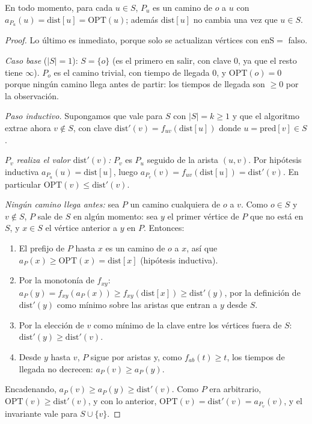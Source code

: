 \begin{lema}
En todo momento, para cada $u\in S$, $P_u$ es un camino de $o$ a $u$ con $a_{P_u}(u)=\mathrm{dist}[u]=\mathrm{OPT}(u)$; además $\mathrm{dist}[u]$ no cambia una vez que $u\in S$.
\end{lema}
\begin{proof}
Lo último es inmediato, porque solo se actualizan vértices con $\mathrm{enS}=$ falso.

\emph{Caso base} ($|S|=1$): $S=\{o\}$ (es el primero en salir, con clave $0$, ya que el resto tiene $\infty$). $P_o$ es el camino trivial, con tiempo de llegada $0$, y $\mathrm{OPT}(o)=0$ porque ningún camino llega antes de partir: los tiempos de llegada son $\ge 0$ por la observación.

\emph{Paso inductivo.} Supongamos que vale para $S$ con $|S|=k\ge1$ y que el algoritmo extrae ahora $v\notin S$, con clave $\mathrm{dist}'(v)=f_{uv}(\mathrm{dist}[u])$ donde $u=\mathrm{pred}[v]\in S$.

\emph{$P_v$ realiza el valor $\mathrm{dist}'(v)$:} $P_v$ es $P_u$ seguido de la arista $(u,v)$. Por hipótesis inductiva $a_{P_u}(u)=\mathrm{dist}[u]$, luego $a_{P_v}(v)=f_{uv}(\mathrm{dist}[u])=\mathrm{dist}'(v)$. En particular $\mathrm{OPT}(v)\le \mathrm{dist}'(v)$.

\emph{Ningún camino llega antes:} sea $P$ un camino cualquiera de $o$ a $v$. Como $o\in S$ y $v\notin S$, $P$ sale de $S$ en algún momento: sea $y$ el primer vértice de $P$ que no está en $S$, y $x\in S$ el vértice anterior a $y$ en $P$. Entonces:
\begin{enumerate}[label=(\roman*)]
\item El prefijo de $P$ hasta $x$ es un camino de $o$ a $x$, así que $a_P(x)\ge \mathrm{OPT}(x)=\mathrm{dist}[x]$ (hipótesis inductiva).
\item Por la monotonía de $f_{xy}$: $a_P(y)=f_{xy}(a_P(x))\ge f_{xy}(\mathrm{dist}[x])\ge \mathrm{dist}'(y)$, por la definición de $\mathrm{dist}'(y)$ como mínimo sobre las aristas que entran a $y$ desde $S$.
\item Por la elección de $v$ como mínimo de la clave entre los vértices fuera de $S$: $\mathrm{dist}'(y)\ge \mathrm{dist}'(v)$.
\item Desde $y$ hasta $v$, $P$ sigue por aristas y, como $f_{ab}(t)\ge t$, los tiempos de llegada no decrecen: $a_P(v)\ge a_P(y)$.
\end{enumerate}
Encadenando, $a_P(v)\ge a_P(y)\ge \mathrm{dist}'(v)$. Como $P$ era arbitrario, $\mathrm{OPT}(v)\ge \mathrm{dist}'(v)$, y con lo anterior, $\mathrm{OPT}(v)=\mathrm{dist}'(v)=a_{P_v}(v)$, y el invariante vale para $S\cup\{v\}$.
\end{proof}

